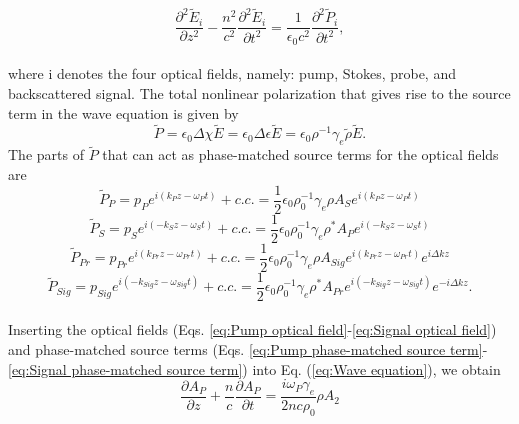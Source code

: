 \documentclass[sn-nature]{sn-jnl}%
\begin{document}
\begin{equation}
    \frac{\partial^{2}\tilde{E}_{i}}{\partial z^{2}} - \frac{n^{2}}{c^{2}}\frac{\partial^{2}\tilde{E}_{i}}{\partial t^{2}} = \frac{1}{\epsilon_{0}c^{2}}\frac{\partial^{2}\tilde{P}_{i}}{\partial t^{2}},
    \label{eq:Wave equation}
\end{equation}
\\
where i denotes the four optical fields, namely: pump, Stokes, probe, and backscattered signal. The total nonlinear polarization that gives rise to the source term in the wave equation is given by
\begin{equation}
    \tilde{P} = \epsilon_{0}\Delta\chi\tilde{E} = \epsilon_{0}\Delta\epsilon\tilde{E} = \epsilon_{0}\rho^{-1}\gamma_{e}\tilde{\rho}\tilde{E}.
\end{equation}
The parts of $\tilde{P}$ that can act as phase-matched source terms for the optical fields are
\begin{equation}
    \tilde{P}_{P} = p_{P}e^{i(k_{P}z - \omega_{P} t)} + c.c. = \frac{1}{2}\epsilon_{0}\rho_{0}^{-1}\gamma_{e}\rho A_{S}e^{i(k_{P}z - \omega_{P} t)}
    \label{eq:Pump phase-matched source term}
\end{equation}
\begin{equation}
    \tilde{P}_{S} = p_{S}e^{i(-k_{S}z - \omega_{S} t)} + c.c. = \frac{1}{2}\epsilon_{0}\rho_{0}^{-1}\gamma_{e}\rho^{*} A_{P}e^{i(-k_{S}z - \omega_{S} t)}
    \label{eq:Stokes phase-matched source term}
\end{equation}
\begin{equation}
    \tilde{P}_{Pr} = p_{Pr}e^{i(k_{Pr}z - \omega_{Pr} t)} + c.c. = \frac{1}{2}\epsilon_{0}\rho_{0}^{-1}\gamma_{e}\rho A_{Sig}e^{i(k_{Pr}z - \omega_{Pr} t)}e^{i\Delta kz}
    \label{eq:Probe phase-matched source term}
\end{equation}
\begin{equation}
    \tilde{P}_{Sig} = p_{Sig}e^{i(-k_{Sig}z - \omega_{Sig} t)} + c.c. = \frac{1}{2}\epsilon_{0}\rho_{0}^{-1}\gamma_{e}\rho^{*} A_{Pr}e^{i(-k_{Sig}z - \omega_{Sig} t)}e^{-i\Delta kz}.
    \label{eq:Signal phase-matched source term}
\end{equation}
\\
Inserting the optical fields (Eqs. \ref{eq:Pump optical field}-\ref{eq:Signal optical field}) and phase-matched source terms (Eqs. \ref{eq:Pump phase-matched source term}-\ref{eq:Signal phase-matched source term}) into Eq. (\ref{eq:Wave equation}), we obtain
\begin{equation}
    \frac{\partial A_{P}}{\partial z} + \frac{n}{c}\frac{\partial A_{P}}{\partial t} = \frac{i\omega_{P}\gamma_{e}}{2nc\rho_{0}}\rho A_{2}
\end{equation}
\end{document}
